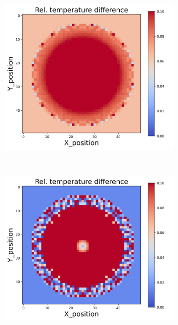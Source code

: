 \begin{figure}[h]
\begin{minipage}{\textwidth}
\begin{subfigure}{0.3\textwidth}
        \end{subfigure}
        \begin{subfigure}{0.3\textwidth}
            \centering
            \includegraphics[width=\textwidth]{figures/raw_data/31/quad/T_bias.jpg}
        \end{subfigure}
    \end{minipage}\\
    \begin{minipage}{\textwidth}
        \centering
        \begin{subfigure}{0.3\textwidth}
            \centering
            \includegraphics[width=\textwidth]{figures/raw_data/32/quad/T_bias.jpg}

\end{subfigure}
\end{minipage}
\end{figure}
